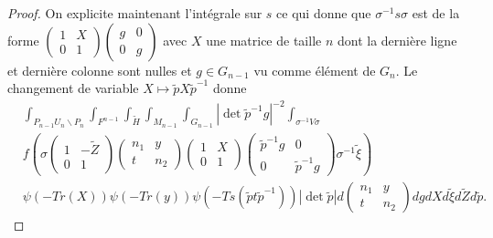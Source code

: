 \documentclass{amsart}
\begin{document}
\begin{proof}
On explicite maintenant l'intégrale sur $s$ ce qui donne que $\sigma^{-1}s \sigma$ est de la forme $\begin{pmatrix}
1 & X \\
0 & 1
\end{pmatrix} \begin{pmatrix}
g & 0 \\
0 & g
\end{pmatrix}$ avec $X$ une matrice de taille $n$ dont la dernière ligne et dernière colonne sont nulles et $g \in G_{n-1}$ vu comme élément de $G_n$.
Le changement de variable $X \mapsto \tilde{p}X\tilde{p}^{-1}$ donne
\begin{equation}
\begin{split}
& \int_{P_{n-1}U_n\backslash{P_n}} \int_{F^{n-1}} \int_{\tilde{H}} \int_{M_{n-1}} \int_{G_{n-1}}  |\det \tilde{p}^{-1}g|^{-2}\int_{\sigma^{-1}V\sigma} \\
& f\left(\sigma \begin{pmatrix}
1 & -\tilde{Z} \\
0 & 1
\end{pmatrix}  \begin{pmatrix}
n_1 & y \\
t & n_2
\end{pmatrix} \begin{pmatrix}
1 & X \\
0 & 1
\end{pmatrix} \begin{pmatrix}
\tilde{p}^{-1} g & 0 \\
0 & \tilde{p}^{-1} g
\end{pmatrix} \sigma^{-1} \tilde{\xi}\right) \\
& \psi(-Tr(X)) \psi(-Tr(y)) \psi(-Ts(\tilde{p}t\tilde{p}^{-1}))  |\det \tilde{p}| d\begin{pmatrix}
n_1 & y \\
t & n_2
\end{pmatrix} dg dX d\tilde{\xi} d\tilde{Z} d\tilde{p}.
\end{split}
\end{equation}


\end{proof}
\end{document}
